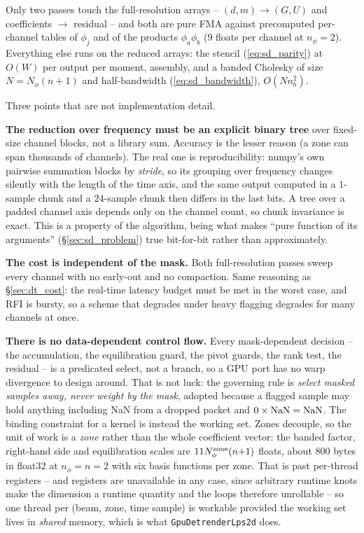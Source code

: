 \documentclass{article}
\numberwithin{equation}{section}   %
\begin{document}
Only two passes touch the full-resolution arrays -- $(d,m) \rightarrow (G,U)$ and coefficients $\rightarrow$
residual -- and both are pure FMA against precomputed per-channel tables of $\phi_j$ and of the products
$\phi_a\phi_b$ ($9$ floats per channel at $n_\phi = 2$).  Everything else runs on the reduced arrays: the
stencil (\ref{eq:sd_parity}) at $O(W)$ per output per moment, assembly, and a banded Cholesky of size
$N = N_\phi(n+1)$ and half-bandwidth (\ref{eq:sd_bandwidth}), $O(N n_b^2)$.

Three points that are not implementation detail.

{\bf The reduction over frequency must be an explicit binary tree} over fixed-size channel blocks, not a
library sum.  Accuracy is the lesser reason (a zone can span thousands of channels).  The real one is
reproducibility: numpy's own pairwise summation blocks by {\em stride}, so its grouping over frequency changes
silently with the length of the time axis, and the same output computed in a $1$-sample chunk and a $24$-sample
chunk then differs in the last bits.  A tree over a padded channel axis depends only on the channel count, so
chunk invariance is exact.  This is a property of the algorithm, being what makes ``pure function of its
arguments'' (\S\ref{sec:sd_problem}) true bit-for-bit rather than approximately.

{\bf The cost is independent of the mask.}  Both full-resolution passes sweep every channel with no early-out
and no compaction.  Same reasoning as \S\ref{sec:dt_cost}: the real-time latency budget must be met in the
worst case, and RFI is bursty, so a scheme that degrades under heavy flagging degrades for many channels at
once.

{\bf There is no data-dependent control flow.}  Every mask-dependent decision -- the accumulation, the
equilibration guard, the pivot guards, the rank test, the residual -- is a predicated select, not a branch, so
a GPU port has no warp divergence to design around.  That is not luck: the governing rule is {\em select masked
samples away, never weight by the mask}, adopted because a flagged sample may hold anything including NaN from
a dropped packet and $0 \times {\rm NaN} = {\rm NaN}$.  The binding constraint for a kernel is instead the
working set.  Zones decouple, so the unit of work is a {\em zone} rather than the whole coefficient vector: the
banded factor, right-hand side and equilibration scales are $11 N_\phi^{\rm zone}(n{+}1)$ floats, about $800$
bytes in float32 at $n_\phi = n = 2$ with six basis functions per zone.  That is past per-thread registers --
and registers are unavailable in any case, since arbitrary runtime knots make the dimension a runtime quantity
and the loops therefore unrollable -- so one thread per (beam, zone, time sample) is workable provided the
working set lives in {\em shared} memory, which is what \texttt{GpuDetrenderLps2d} does.
\end{document}
